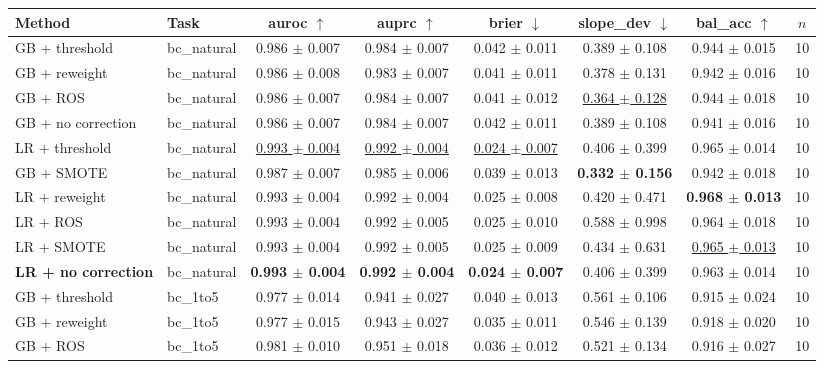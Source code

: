 \begin{tabular}{llcccccc}
\toprule
Method & Task & auroc $\uparrow$ & auprc $\uparrow$ & brier $\downarrow$ & slope\_dev $\downarrow$ & bal\_acc $\uparrow$ & $n$ \\
\midrule
GB + threshold & bc\_natural & 0.986 $\pm$ 0.007 & 0.984 $\pm$ 0.007 & 0.042 $\pm$ 0.011 & 0.389 $\pm$ 0.108 & 0.944 $\pm$ 0.015 & 10 \\
GB + reweight & bc\_natural & 0.986 $\pm$ 0.008 & 0.983 $\pm$ 0.007 & 0.041 $\pm$ 0.011 & 0.378 $\pm$ 0.131 & 0.942 $\pm$ 0.016 & 10 \\
GB + ROS & bc\_natural & 0.986 $\pm$ 0.007 & 0.984 $\pm$ 0.007 & 0.041 $\pm$ 0.012 & \underline{0.364 $\pm$ 0.128} & 0.944 $\pm$ 0.018 & 10 \\
GB + no correction & bc\_natural & 0.986 $\pm$ 0.007 & 0.984 $\pm$ 0.007 & 0.042 $\pm$ 0.011 & 0.389 $\pm$ 0.108 & 0.941 $\pm$ 0.016 & 10 \\
LR + threshold & bc\_natural & \underline{0.993 $\pm$ 0.004} & \underline{0.992 $\pm$ 0.004} & \underline{0.024 $\pm$ 0.007} & 0.406 $\pm$ 0.399 & 0.965 $\pm$ 0.014 & 10 \\
GB + SMOTE & bc\_natural & 0.987 $\pm$ 0.007 & 0.985 $\pm$ 0.006 & 0.039 $\pm$ 0.013 & \textbf{0.332 $\pm$ 0.156} & 0.942 $\pm$ 0.018 & 10 \\
LR + reweight & bc\_natural & 0.993 $\pm$ 0.004 & 0.992 $\pm$ 0.004 & 0.025 $\pm$ 0.008 & 0.420 $\pm$ 0.471 & \textbf{0.968 $\pm$ 0.013} & 10 \\
LR + ROS & bc\_natural & 0.993 $\pm$ 0.004 & 0.992 $\pm$ 0.005 & 0.025 $\pm$ 0.010 & 0.588 $\pm$ 0.998 & 0.964 $\pm$ 0.018 & 10 \\
LR + SMOTE & bc\_natural & 0.993 $\pm$ 0.004 & 0.992 $\pm$ 0.005 & 0.025 $\pm$ 0.009 & 0.434 $\pm$ 0.631 & \underline{0.965 $\pm$ 0.013} & 10 \\
\textbf{LR + no correction} & bc\_natural & \textbf{0.993 $\pm$ 0.004} & \textbf{0.992 $\pm$ 0.004} & \textbf{0.024 $\pm$ 0.007} & 0.406 $\pm$ 0.399 & 0.963 $\pm$ 0.014 & 10 \\
\midrule
GB + threshold & bc\_1to5 & 0.977 $\pm$ 0.014 & 0.941 $\pm$ 0.027 & 0.040 $\pm$ 0.013 & 0.561 $\pm$ 0.106 & 0.915 $\pm$ 0.024 & 10 \\
GB + reweight & bc\_1to5 & 0.977 $\pm$ 0.015 & 0.943 $\pm$ 0.027 & 0.035 $\pm$ 0.011 & 0.546 $\pm$ 0.139 & 0.918 $\pm$ 0.020 & 10 \\
GB + ROS & bc\_1to5 & 0.981 $\pm$ 0.010 & 0.951 $\pm$ 0.018 & 0.036 $\pm$ 0.012 & 0.521 $\pm$ 0.134 & 0.916 $\pm$ 0.027 & 10 \\

\end{tabular}
